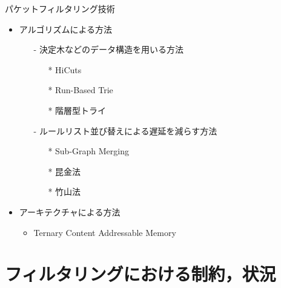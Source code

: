\documentclass[12pt,dvipdfmx,mathserif,uplatex,aspectratio=32]{beamer}
\begin{document}
\begin{frame}{パケットフィルタリング技術}

\begin{itemize}
 \item アルゴリズムによる方法 \vspace{2mm}
   \begin{itemize}
     \item[-] 決定木などのデータ構造を用いる方法 \vspace{2mm}
       \begin{itemize}
         \item[*] HiCuts \vspace{1mm}
         \item[*] Run-Based Trie \vspace{1mm}
         \item[*] 階層型トライ \vspace{1mm}
       \end{itemize} \vspace{2mm}
     \item[-] ルールリスト並び替えによる遅延を減らす方法 \vspace{2mm}
       \begin{itemize}
         \item[*] Sub-Graph Merging \vspace{1mm}
         \item[*] 昆金法 \vspace{1mm}
         \item[*] 竹山法 \vspace{1mm}
       \end{itemize} \vspace{2mm}
   \end{itemize}
 \item アーキテクチャによる方法
   \begin{itemize}
     \item Ternary Content Addressable Memory
   \end{itemize}
\end{itemize}

\end{frame}


\section{フィルタリングにおける制約，状況}
\end{document}

